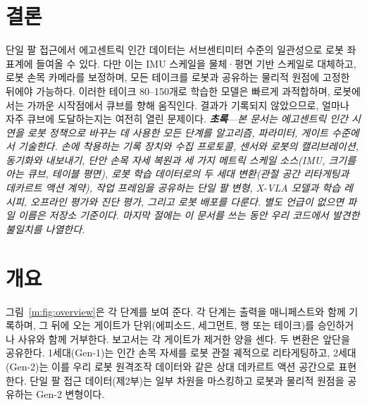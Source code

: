 \documentclass[conference,10pt]{IEEEtran}
\newcounter{rpart}
\newcommand{\reportpart}[3]{\clearpage\stepcounter{rpart}\setcounter{section}{0}%
  \twocolumn[{\centering{\LARGE\bfseries #1\par}\vspace{1.5mm}{\large #2\par}\vspace{3mm}\hrule\vspace{5mm}}]\label{#3}}
\newcommand{\partabstract}[1]{\noindent\textbf{\textit{초록}}---\textit{#1}\par\medskip}
\begin{document}
\section{결론}
단일 팔 접근에서 에고센트릭 인간 데이터는 서브센티미터 수준의 일관성으로 로봇 좌표계에 들여올 수 있다. 다만 이는 IMU
스케일을 물체·평면 기반 스케일로 대체하고, 로봇 손목 카메라를 보정하며, 모든 테이크를 로봇과 공유하는 물리적 원점에
고정한 뒤에야 가능하다. 이러한 테이크 80--150개로 학습한 모델은 빠르게 과적합하며, 로봇에서는 가까운 시작점에서 큐브를
향해 움직인다. 결과가 기록되지 않았으므로, 얼마나 자주 큐브에 도달하는지는 여전히 열린 문제이다.
\reportpart{방법과 파이프라인}{각 단계의 작동 방식(제1부·제2부의 동반 문서)}{part:m}
\partabstract{본 문서는 에고센트릭 인간 시연을 로봇 정책으로 바꾸는 데 사용한 모든 단계를 알고리즘, 파라미터, 게이트 수준에서 기술한다. 손에
착용하는 기록 장치와 수집 프로토콜, 센서와 로봇의 캘리브레이션, 동기화와 내보내기, 단안 손목 자세 복원과 세 가지 메트릭 스케일
소스(IMU, 크기를 아는 큐브, 테이블 평면), 로봇 학습 데이터로의 두 세대 변환(관절 공간 리타게팅과 데카르트 액션 계약), 작업
프레임을 공유하는 단일 팔 변형, X-VLA 모델과 학습 레시피, 오프라인 평가와 진단 평가, 그리고 로봇 배포를 다룬다. 별도 언급이 없으면
파일 이름은 저장소 기준이다. 마지막 절에는 이 문서를 쓰는 동안 우리 코드에서 발견한 불일치를 나열한다.}
\section{개요}
그림~\ref{m:fig:overview}은 각 단계를 보여 준다. 각 단계는 출력을 매니페스트와 함께 기록하며, 그 뒤에 오는 게이트가 단위(에피소드,
세그먼트, 행 또는 테이크)를 승인하거나 사유와 함께 거부한다. 보고서는 각 게이트가 제거한 양을 센다. 두 변환은 앞단을 공유한다.
1세대(Gen-1)는 인간 손목 자세를 로봇 관절 궤적으로 리타게팅하고, 2세대(Gen-2)는 이를 우리 로봇 원격조작 데이터와 같은 상대
데카르트 액션 공간으로 표현한다. 단일 팔 접근 데이터(제2부)는 일부 차원을 마스킹하고 로봇과 물리적 원점을 공유하는 Gen-2 변형이다.
\end{document}
